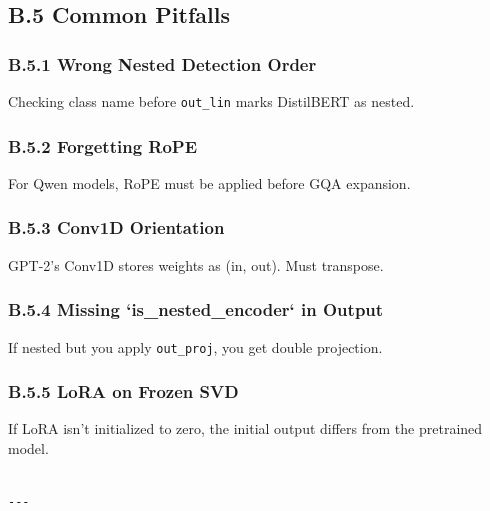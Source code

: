 \subsection{B.5 Common Pitfalls}

\subsubsection{B.5.1 Wrong Nested Detection Order}

Checking class name before \texttt{out\_lin} marks DistilBERT as nested.

\subsubsection{B.5.2 Forgetting RoPE}

For Qwen models, RoPE must be applied before GQA expansion.

\subsubsection{B.5.3 Conv1D Orientation}

GPT-2's Conv1D stores weights as (in, out). Must transpose.

\subsubsection{B.5.4 Missing `is\_nested\_encoder` in Output}

If nested but you apply \texttt{out\_proj}, you get double projection.

\subsubsection{B.5.5 LoRA on Frozen SVD}

If LoRA isn't initialized to zero, the initial output differs from the 
pretrained model.
\begin{lstlisting}

---
\end{lstlisting}